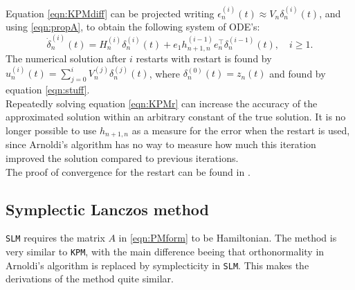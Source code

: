 \noindent Equation \eqref{eqn:KPMdiff} can be projected writing $ \epsilon^{(i)}_n(t)  \approx V_n \delta_n^{(i)}(t) $, and using \eqref{eqn:propA}, to obtain the following system of ODE's:
\begin{equation}
\dot{\delta}^{(i)}_n(t) = H_n^{(i)} \delta_n^{(i)}(t) + e_1 h_{n+1,n}^{(i-1)} e^\top_n \delta_n^{(i-1)}(t), \quad i \geq 1.
\label{eqn:KPMr}
\end{equation}
\noindent The numerical solution after $i$ restarts with restart is found by $ u_n^{(i)}(t) = \sum \limits_{j = 0} ^i V_n^{(j)} \delta_n^{(j)} (t) $, where $\delta_n^{(0)} (t) = z_n(t)$ and found by equation \eqref{eqn:stuff}.\\%

\noindent Repeatedly solving equation \eqref{eqn:KPMr} can increase the accuracy of the approximated solution within an arbitrary constant of the true solution. It is no longer possible to use $h_{n+1,n}$ as a measure for the error when the restart is used, since Arnoldi's algorithm has no way to measure how much this iteration improved the solution compared to previous iterations.\\

\noindent The proof of convergence for the restart can be found in \cite{elenaconv}.\\
\subsection{Symplectic Lanczos method}
\texttt{SLM} requires the matrix $A$ in \eqref{eqn:PMform} to be Hamiltonian. The method is very similar to \texttt{KPM}, with the main difference beeing that orthonormality in Arnoldi's algorithm is replaced by symplecticity in \texttt{SLM}. This makes the derivations of the method quite similar.\\

